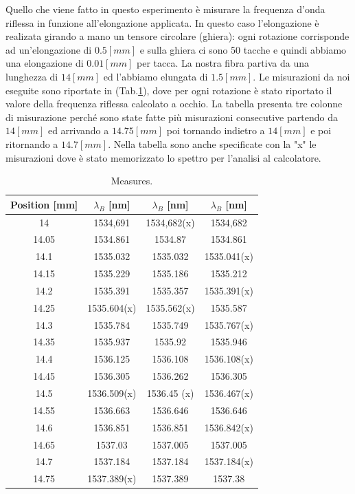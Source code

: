 Quello che viene fatto in questo esperimento è misurare la frequenza d'onda riflessa in funzione all'elongazione applicata. In questo caso l'elongazione è realizata girando a mano un tensore circolare (ghiera): ogni rotazione corrisponde ad un'elongazione di $0.5[mm]$ e sulla ghiera ci sono 50 tacche e quindi abbiamo una elongazione di $0.01[mm]$ per tacca. La nostra fibra partiva da una lunghezza di $14[mm]$ ed l'abbiamo elungata di $1.5[mm]$. Le misurazioni da noi eseguite sono riportate in (Tab.\ref{table:measures}), dove per ogni rotazione è stato riportato il valore della frequenza riflessa calcolato a occhio. La tabella presenta tre colonne di misurazione perché sono state fatte più misurazioni consecutive partendo da $14[mm]$ ed arrivando a $14.75[mm]$ poi tornando indietro a $14[mm]$ e poi ritornando a $14.7[mm]$. Nella tabella sono anche specificate con la "x" le misurazioni dove è stato memorizzato lo spettro per l'analisi al calcolatore.
\begin{table}[h]
  \centering
  \begin{tabular}{c|c|c|c}
      Position [mm]  &  $\lambda_B$  [nm]  &  $\lambda_B$  [nm]  &  $\lambda_B$  [nm]  \\
      \hline
      14     &  1534,691     &  1534,682(x)  &  1534,682     \\
      14.05  &  1534.861     &  1534.87      &  1534.861     \\
      14.1   &  1535.032     &  1535.032     &  1535.041(x)  \\
      14.15  &  1535.229     &  1535.186     &  1535.212     \\
      14.2   &  1535.391     &  1535.357     &  1535.391(x)  \\
      14.25  &  1535.604(x)  &  1535.562(x)  &  1535.587     \\
      14.3   &  1535.784     &  1535.749     &  1535.767(x)  \\
      14.35  &  1535.937     &  1535.92      &  1535.946     \\
      14.4   &  1536.125     &  1536.108     &  1536.108(x)  \\
      14.45  &  1536.305     &  1536.262     &  1536.305     \\
      14.5   &  1536.509(x)  &  1536.45 (x)  &  1536.467(x)  \\
      14.55  &  1536.663     &  1536.646     &  1536.646     \\
      14.6   &  1536.851     &  1536.851     &  1536.842(x)  \\
      14.65  &  1537.03      &  1537.005     &  1537.005     \\
      14.7   &  1537.184     &  1537.184     &  1537.184(x)  \\
      14.75  &  1537.389(x)  &  1537.389     &  1537.38      \\

  \end{tabular}
  \caption{Measures.}
  \label{table:measures}
\end{table}
